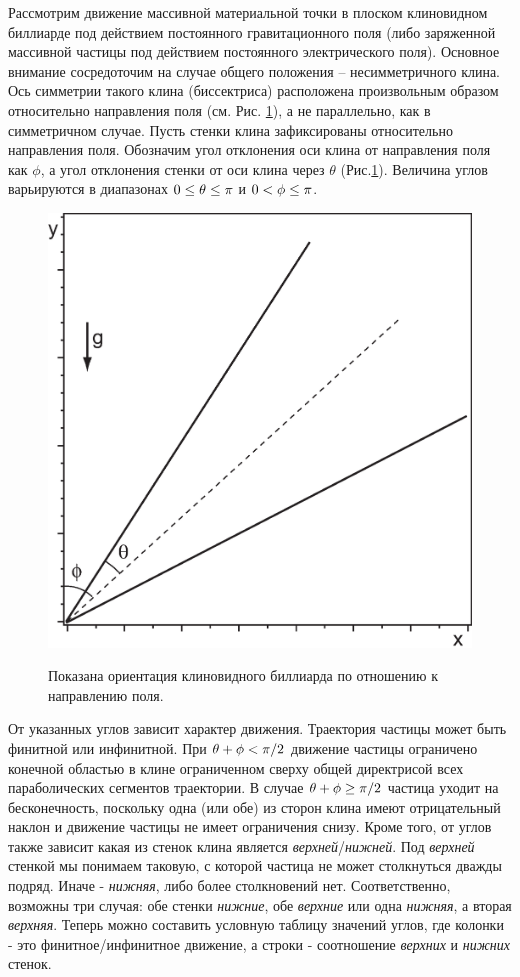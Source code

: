 \documentclass[a4paper]{article}
\begin{document}
Рассмотрим движение массивной материальной точки в плоском клиновидном биллиарде под действием постоянного гравитационного поля (либо заряженной массивной частицы под действием постоянного электрического поля). Основное внимание сосредоточим на случае общего положения -- несимметричного клина. Ось симметрии такого клина (биссектриса) расположена произвольным образом относительно направления поля (см. Рис. \ref{image1}), а не параллельно, как в симметричном случае. Пусть стенки клина зафиксированы относительно направления поля. Обозначим угол отклонения оси клина от направления поля как $\phi $, а угол отклонения стенки от оси клина через $\theta $ (Рис.\ref{image1}). Величина углов варьируются в диапазонах ${\rm 0}\le \theta \le \pi $ и ${\rm 0}<\phi \le \pi$.
\begin{figure}[ht]
  \centering
  \includegraphics[width=6 cm]{in1.eps}\\
  \caption{Показана ориентация клиновидного биллиарда по отношению к направлению поля.}\label{image1}
\end{figure}



От указанных углов зависит характер движения. Траектория частицы может быть финитной или инфинитной. При $\theta+\phi<\pi /{\rm 2}$ движение частицы ограничено конечной областью в клине ограниченном сверху общей директрисой всех параболических сегментов траектории. В случае $\theta +\phi \ge \pi /{\rm 2}$ частица уходит на бесконечность, поскольку одна (или обе) из сторон клина имеют отрицательный наклон и движение частицы не имеет ограничения снизу. Кроме того, от углов также зависит какая из стенок клина является \textit{верхней}/\textit{нижней}. Под \textit{верхней} стенкой мы понимаем таковую, с которой частица не может столкнуться дважды подряд. Иначе - \textit{нижняя}, либо более столкновений нет. Соответственно, возможны три случая: обе стенки \textit{нижние}, обе \textit{верхние} или одна \textit{нижняя}, а вторая \textit{верхняя}. Теперь можно составить условную таблицу значений углов, где колонки - это финитное/инфинитное движение, а строки - соотношение \textit{верхних}  и \textit{нижних} стенок.
\end{document}
